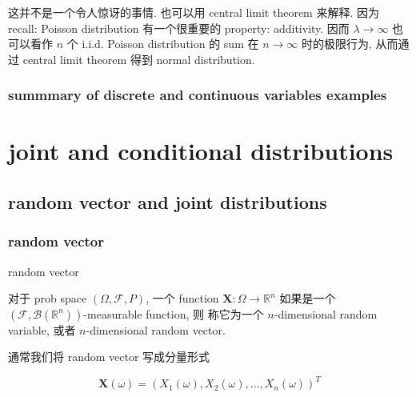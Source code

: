\documentclass{qlnotes-export}
\begin{document}
这并不是一个令人惊讶的事情. 也可以用 central limit theorem 来解释. 因为 recall: Poisson distribution 有一个很重要的 property: additivity. 因而 \(\lambda\rightarrow\infty\) 也可以看作 \(n\) 个 i.i.d. Poisson distribution 的 sum 在 \(n\rightarrow\infty\) 时的极限行为, 从而通过 central limit theorem 得到 normal distribution.

\subsection{summmary of discrete and continuous variables examples}\label{summmary-of-discrete-and-continuous-variables-examples}

\begin{center}

\end{center}

\chapter{joint and conditional distributions}\label{joint-and-conditional-distributions}

\section{random vector and joint distributions}\label{random-vector-and-joint-distributions}

\subsection{random vector}\label{random-vector}

\begin{definition}{random vector}\label{def-03-joint-conditional-distribution-random-vector}

对于 prob space \((\Omega,\mathcal{F},P)\), 一个 function \(\mathbf{X}:\Omega\rightarrow{\mathbb{R}}^{n}\) 如果是一个 \((\mathcal{F},\mathcal{B}({\mathbb{R}}^{n}))\)-measurable function, 则 称它为一个 \(n\)-dimensional random variable, 或者 \(n\)-dimensional random vector.

通常我们将 random vector 写成分量形式

\[\mathbf{X}(\omega) = (X_{1}(\omega),X_{2}(\omega),\ldots,X_{n}(\omega))^{T}\]

\end{definition}
\end{document}
